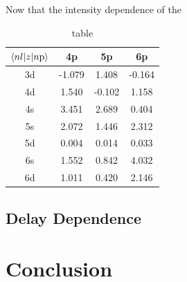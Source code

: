 Now that the intensity dependence of the 

\begin{table}[]
	\centering
	\begin{tabular}{cccc}
		\toprule
		$\braket{nl|z|n\mathrm{p}}$ &     4p &     5p &     6p \\
		\midrule
		3d & -1.079 &  1.408 & -0.164 \\
		4d &  1.540 & -0.102 &  1.158 \\
		4s &  3.451 &  2.689 &  0.404 \\
		5s &  2.072 &  1.446 &  2.312 \\
		5d &  0.004 &  0.014 &  0.033 \\
		6s &  1.552 &  0.842 &  4.032 \\
		6d &  1.011 &  0.420 &  2.146 \\
		\bottomrule
	\end{tabular}
	\caption{table}
	\label{tab:matrix_elements}
\end{table}


\subsection{Delay Dependence}
\label{sec:ATS_ar_delay}

\section{Conclusion}
\label{sec:ATS_conclusion}

